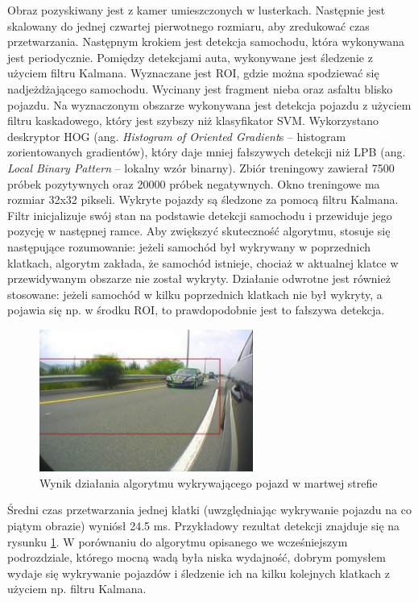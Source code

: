 Obraz pozyskiwany jest z kamer umieszczonych w lusterkach. 
Następnie jest skalowany do jednej czwartej pierwotnego rozmiaru, aby zredukować czas przetwarzania. 
Następnym krokiem jest detekcja samochodu, która wykonywana jest periodycznie. 
Pomiędzy detekcjami auta, wykonywane jest śledzenie z użyciem filtru Kalmana. 
Wyznaczane jest ROI, gdzie można spodziewać się nadjeżdżającego samochodu. 
Wycinany jest fragment nieba oraz asfaltu blisko pojazdu.
Na wyznaczonym obszarze wykonywana jest detekcja pojazdu z użyciem filtru kaskadowego, który jest szybszy niż klasyfikator SVM.
Wykorzystano deskryptor HOG (ang. \textit{Histogram of Oriented Gradient}s -- histogram zorientowanych gradientów), który daje mniej fałszywych detekcji niż LPB (ang. \textit{Local Binary Pattern} -- lokalny wzór binarny).
Zbiór treningowy zawierał 7500 próbek pozytywnych oraz 20000 próbek negatywnych. 
Okno treningowe ma rozmiar 32x32 pikseli. 
Wykryte pojazdy są śledzone za pomocą filtru Kalmana. 
Filtr inicjalizuje swój stan na podstawie detekcji samochodu i przewiduje jego pozycję w następnej ramce.
Aby zwiększyć skuteczność algorytmu, stosuje się następujące rozumowanie: jeżeli samochód był wykrywany w poprzednich klatkach, algorytm zakłada, że samochód istnieje, chociaż w aktualnej klatce w przewidywanym obszarze nie został wykryty. 
Działanie odwrotne jest również stosowane: jeżeli samochód w kilku poprzednich klatkach nie był wykryty, a pojawia się np. w środku ROI, to prawdopodobnie jest to fałszywa detekcja. 

\begin{figure}
  \centering
  \includegraphics[width=7cm]{img/car_detection2_result.png}
  \caption{Wynik działania algorytmu wykrywającego pojazd w martwej strefie\cite{T11}}
  \label{fig:car_detection2_result}
\end{figure}

Średni czas przetwarzania jednej klatki (uwzględniając wykrywanie pojazdu na co piątym obrazie) wyniósł 24.5 ms. 
Przykładowy rezultat detekcji znajduje się na rysunku \ref{fig:car_detection2_result}.
W porównaniu do algorytmu opisanego we wcześniejszym podrozdziale, którego mocną wadą była niska wydajność, dobrym pomysłem wydaje się wykrywanie pojazdów i śledzenie ich na kilku kolejnych klatkach z użyciem np. filtru Kalmana.

